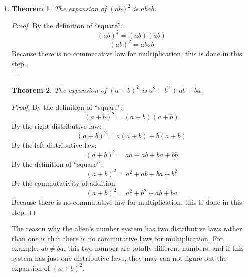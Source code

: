\documentclass{article}
\newtheorem{theorem}{Theorem}
\begin{document}
\begin{enumerate}
\begin{enumerate}
\begin{proof}
                Let $a$ and $b$ be integers.\\
                Then,\\
                By the definition of ``square'':
                \[(a + b) ^ 2 = (a + b)(a + b)\]
                By distributive property:
                \[(a + b) ^ 2 = a(a + b) + b(a + b)\]
                By distributive property:
                \[(a + b) ^ 2 = aa + ab + ba + bb\]
                By commutative property:
                \[(a + b) ^ 2 = aa + ab + ab + bb\]
                By the definition of ``square'':
                \[(a + b) ^ 2 = a ^ 2 + ab + ab + b^2\]
                Thus, 
                \[(a + b) ^ 2 = a ^ 2 + 2ab + b^2\]
            \end{proof}
            \item 
            \begin{theorem}\label{thm:thm1}
                The expansion of $(ab) ^ 2$ is $abab$.
            \end{theorem}
            \begin{proof}
                By the definition of ``square'':
                \[(ab) ^ 2 = (ab)(ab)\]
                \[(ab) ^ 2 = abab\]
                Because there is no commutative law for multiplication, this is done in this step.\\
            \end{proof}
            \begin{theorem}\label{thm:thm2}
                The expansion of $(a + b) ^ 2$ is $a ^ 2 + b ^ 2 + ab + ba$.
            \end{theorem}
            \begin{proof}
                By the definition of ``square'':
                \[(a + b) ^ 2 = (a + b)(a + b)\]
                By the right distributive law:
                \[(a + b) ^ 2 = a(a + b) + b (a + b)\]
                By the left distributive law:
                \[(a + b) ^ 2 = aa + ab + ba + bb\]
                By the definition of ``square'':
                \[(a + b) ^ 2 = a ^ 2 + ab + ba + b ^ 2\]
                By the commutativity of addition:
                \[(a + b) ^ 2 = a ^ 2 + b ^ 2 + ab + ba\]
                Because there is no commutative law for multiplication, this is done in this step.            
            \end{proof}
            The reason why the alien's number system has two distributive laws rather than one is that there is no commutative laws for multiplication.
            For example, $ab \neq ba$. this two number are totally different numbers, and if this system has just one distributive laws, they may can not figure out the expansion of $(a + b) ^ 2$.
        \end{enumerate}


\end{enumerate}
\end{document}
